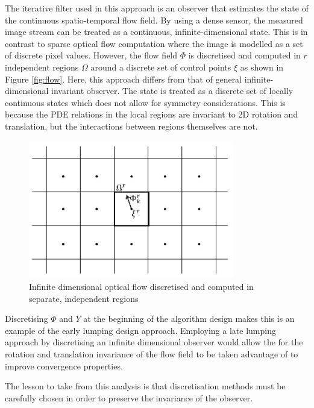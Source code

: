 The iterative filter used in this approach is an observer that estimates the state of the continuous spatio-temporal flow field. By using a dense sensor, the measured image stream can be treated as a continuous, infinite-dimensional state. This is in contrast to sparse optical flow computation where the image is modelled as a set of discrete pixel values. However, the flow field $\Phi$ is discretised and computed in $r$ independent regions $\Omega$ around a discrete set of control points $\xi$ as shown in Figure \ref{fig:flow}. Here, this approach differs from that of general infinite-dimensional invariant observer. The state is treated as a discrete set of locally continuous states which does not allow for symmetry considerations. This is because the PDE relations in the local regions are invariant to 2D rotation and translation, but the interactions between regions themselves are not. 

\begin{figure}
\centering
  \includegraphics[width=0.8\textwidth,trim = 0mm 0mm 0mm 0mm,clip]{./Figures/flow_regions.jpg}
  \caption{Infinite dimensional optical flow discretised and computed in separate, independent regions} \label{fig:flow_regions}
\end{figure} \label{fig:flow}

Discretising $\Phi$ and $Y$ at the beginning of the algorithm design makes this is an example of the early lumping design approach. Employing a late lumping approach by discretising an infinite dimensional observer would allow the for the rotation and translation invariance of the flow field to be taken advantage of to improve convergence properties.

The lesson to take from this analysis is that discretisation methods must be carefully chosen in order to preserve the invariance of the observer.



